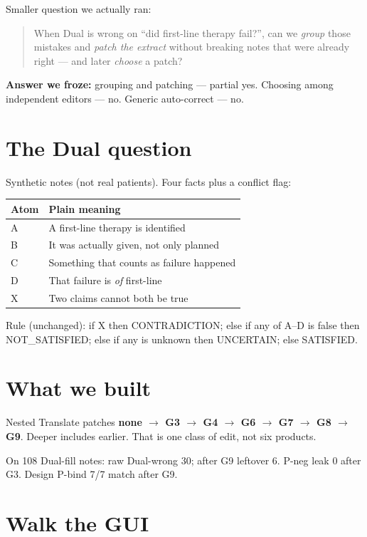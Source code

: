 \documentclass[11pt,a4paper]{article}
\begin{document}
Smaller question we actually ran:

\begin{quote}
When Dual is wrong on ``did first-line therapy fail?'', can we \emph{group} those mistakes and \emph{patch the extract} without breaking notes that were already right --- and later \emph{choose} a patch?
\end{quote}

\textbf{Answer we froze:} grouping and patching --- partial yes. Choosing among independent editors --- no. Generic auto-correct --- no.

\section{The Dual question}

Synthetic notes (not real patients). Four facts plus a conflict flag:

\begin{center}
\begin{tabular}{@{}ll@{}}
\toprule
Atom & Plain meaning \\
\midrule
A & A first-line therapy is identified \\
B & It was actually given, not only planned \\
C & Something that counts as failure happened \\
D & That failure is \emph{of} first-line \\
X & Two claims cannot both be true \\
\bottomrule
\end{tabular}
\end{center}

Rule (unchanged): if X then CONTRADICTION; else if any of A--D is false then NOT\_SATISFIED; else if any is unknown then UNCERTAIN; else SATISFIED.

\section{What we built}

Nested Translate patches \textbf{none $\rightarrow$ G3 $\rightarrow$ G4 $\rightarrow$ G6 $\rightarrow$ G7 $\rightarrow$ G8 $\rightarrow$ G9}.
Deeper includes earlier. That is one class of edit, not six products.

On 108 Dual-fill notes: raw Dual-wrong 30; after G9 leftover 6. P-neg leak 0 after G3. Design P-bind 7/7 match after G9.

\section{Walk the GUI}
\end{document}
